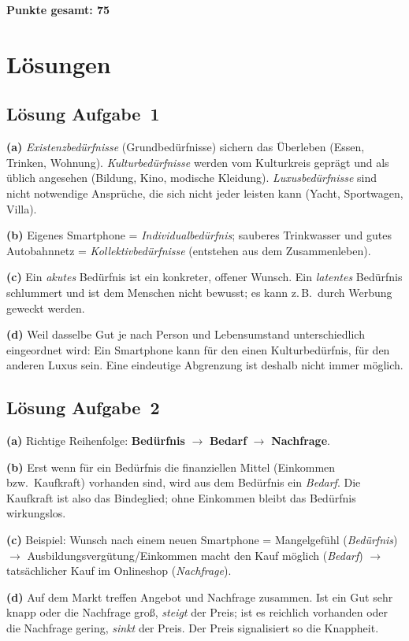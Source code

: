\documentclass[11pt, a4paper]{article}
\begin{document}
\vspace{1em}
\noindent\textbf{Punkte gesamt: 75}

\newpage

\section{Lösungen}\label{loesungen}

\subsection*{Lösung Aufgabe~1}
\begin{loesung}
\textbf{(a)} \emph{Existenzbedürfnisse} (Grundbedürfnisse) sichern das Überleben (Essen,
Trinken, Wohnung). \emph{Kulturbedürfnisse} werden vom Kulturkreis geprägt und als üblich
angesehen (Bildung, Kino, modische Kleidung). \emph{Luxusbedürfnisse} sind nicht notwendige
Ansprüche, die sich nicht jeder leisten kann (Yacht, Sportwagen, Villa).

\textbf{(b)} Eigenes Smartphone = \emph{Individualbedürfnis}; sauberes Trinkwasser und gutes
Autobahnnetz = \emph{Kollektivbedürfnisse} (entstehen aus dem Zusammenleben).

\textbf{(c)} Ein \emph{akutes} Bedürfnis ist ein konkreter, offener Wunsch. Ein
\emph{latentes} Bedürfnis schlummert und ist dem Menschen nicht bewusst; es kann z.\,B.\
durch Werbung geweckt werden.

\textbf{(d)} Weil dasselbe Gut je nach Person und Lebensumstand unterschiedlich eingeordnet
wird: Ein Smartphone kann für den einen Kulturbedürfnis, für den anderen Luxus sein. Eine
eindeutige Abgrenzung ist deshalb nicht immer möglich.
\end{loesung}

\subsection*{Lösung Aufgabe~2}
\begin{loesung}
\textbf{(a)} Richtige Reihenfolge: \textbf{Bedürfnis} $\rightarrow$ \textbf{Bedarf}
$\rightarrow$ \textbf{Nachfrage}.

\textbf{(b)} Erst wenn für ein Bedürfnis die finanziellen Mittel (Einkommen bzw.\ Kaufkraft)
vorhanden sind, wird aus dem Bedürfnis ein \emph{Bedarf}. Die Kaufkraft ist also das
Bindeglied; ohne Einkommen bleibt das Bedürfnis wirkungslos.

\textbf{(c)} Beispiel: Wunsch nach einem neuen Smartphone = Mangelgefühl (\emph{Bedürfnis})
$\rightarrow$ Ausbildungsvergütung/Einkommen macht den Kauf möglich (\emph{Bedarf})
$\rightarrow$ tatsächlicher Kauf im Onlineshop (\emph{Nachfrage}).

\textbf{(d)} Auf dem Markt treffen Angebot und Nachfrage zusammen. Ist ein Gut sehr knapp
oder die Nachfrage groß, \emph{steigt} der Preis; ist es reichlich vorhanden oder die
Nachfrage gering, \emph{sinkt} der Preis. Der Preis signalisiert so die Knappheit.
\end{loesung}
\end{document}

